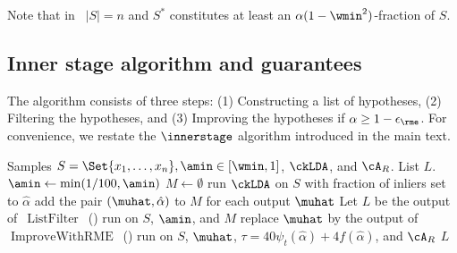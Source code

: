 Note that in~ $|S| = n$ and $S^*$ constitutes at least an $\alpha(1-\wmin^2)$-fraction of $S$.


\subsection{Inner stage algorithm and guarantees}

The algorithm consists of three steps: (1) Constructing a list of hypotheses, (2) Filtering the hypotheses, and (3) Improving the hypotheses if $\alpha \geq 1-\epsilon_{\rme}$. For convenience, we restate the \(\innerstage\) algorithm introduced in the main text.

\begin{algorithm}[t]
\caption{\(\innerstage\)}
    \begin{algorithmic}[1]
        \Require Samples \(S = \Set{x_1, \ldots, x_{n}}, \amin \in [\wmin, 1]\), 
    $\ckLDA$, and $\cA_{R}$.
        \Ensure List \(L\).
        \State \(\amin \gets \min(1/100, \amin)\)
        \State \(M \gets \emptyset\)
        \State run $\ckLDA$ on $S$ with fraction of inliers set to $\hat\alpha$
        \State add the pair $(\muhat, \hat\alpha)$ to $M$ for each output \(\muhat\)
        \EndFor
        \State Let \(L\) be the output of~\(\operatorname{ListFilter}\)~() run on \(S\), \(\amin\), and $M$
        \State replace $\muhat$ by the output of~\(\operatorname{ImproveWithRME}\)~() run on $S$, $\muhat$, $\tau = 40\psi_t(\hat\alpha)+4f(\hat\alpha)$, and $\cA_{R}$
        \EndFor
    \State \Return \(L\)
    \end{algorithmic}
\end{algorithm}

